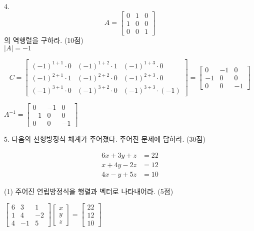 \documentclass[aspectratio=169]{beamer}
\begin{document}
\begin{frame}
  4. 
  \[
  A = \begin{bmatrix}
  0 & 1 & 0 \\
  1 & 0 & 0 \\
  0 & 0 & 1
  \end{bmatrix}
  \]
  의 역행렬을 구하라. (10점) \\
  
  $|A| = -1$


  \[
  C = \begin{bmatrix}
    (-1)^{1+1}\cdot 0 & (-1)^{1+2}\cdot 1 & (-1)^{1+3}\cdot 0 \\
    (-1)^{2+1}\cdot 1 & (-1)^{2+2}\cdot 0 & (-1)^{2+3}\cdot 0 \\
    (-1)^{3+1}\cdot 0 & (-1)^{3+2}\cdot 0 & (-1)^{3+3}\cdot (-1) 
  \end{bmatrix}
  = \begin{bmatrix}
    0  & -1 &  0 \\
    -1 &  0 &  0 \\
    0  &  0 & -1 
  \end{bmatrix}
  \]

  $
  A^{-1}= \begin{bmatrix}
    0  & -1 &  0 \\
    -1 &  0 &  0 \\
    0  &  0 & -1 
  \end{bmatrix}
  $


\end{frame}



\begin{frame}
  5. 다음의 선형방정식 체계가 주어졌다. 주어진 문제에 답하라. (30점)

\[
\begin{aligned}
6x + 3y + z &= 22 \\
x + 4y - 2z &= 12 \\
4x - y + 5z &= 10
\end{aligned}
\]


(1) 주어진 연립방정식을 행렬과 벡터로 나타내어라. (5점)

$
\begin{bmatrix}
  6  &  3  &  1 \\
  1  &  4  & -2 \\
  4  &  -1 &  5 
\end{bmatrix}
\begin{bmatrix}
  x \\
  y \\
  z 
\end{bmatrix}
=
\begin{bmatrix}
  22 \\
  12 \\
  10 
\end{bmatrix}
$




\end{frame}
\end{document}
